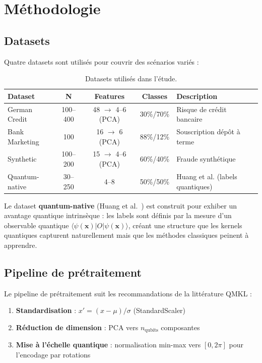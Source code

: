 \documentclass[12pt,a4paper]{article}
\newcommand{\x}{\mathbf{x}}
\begin{document}
\section{Méthodologie}
\label{sec:methodologie}

\subsection{Datasets}

Quatre datasets sont utilisés pour couvrir des scénarios variés :

\begin{table}[H]
\centering
\caption{Datasets utilisés dans l'étude.}
\label{tab:datasets}
\begin{tabular}{lcccp{5cm}}
\toprule
\textbf{Dataset} & \textbf{N} & \textbf{Features} & \textbf{Classes} & \textbf{Description} \\
\midrule
German Credit    & 100--400 & 48 $\to$ 4--6 (PCA) & 30\%/70\% & Risque de crédit bancaire \\
Bank Marketing   & 100      & 16 $\to$ 6 (PCA)    & 88\%/12\% & Souscription dépôt à terme \\
Synthetic        & 100--200 & 15 $\to$ 4--6 (PCA) & 60\%/40\% & Fraude synthétique \\
Quantum-native   & 30--250  & 4--8                 & 50\%/50\% & Huang et al. (labels quantiques) \\
\bottomrule
\end{tabular}
\end{table}

Le dataset \textbf{quantum-native} (Huang et al.~\cite{huang2021}) est construit pour exhiber un avantage quantique intrinsèque : les labels sont définis par la mesure d'un observable quantique $\langle \psi(\x) | O | \psi(\x) \rangle$, créant une structure que les kernels quantiques capturent naturellement mais que les méthodes classiques peinent à apprendre.

\subsection{Pipeline de prétraitement}

Le pipeline de prétraitement suit les recommandations de la littérature QMKL :
\begin{enumerate}[noitemsep]
    \item \textbf{Standardisation} : $x' = (x - \mu) / \sigma$ (StandardScaler)
    \item \textbf{Réduction de dimension} : PCA vers $n_{\text{qubits}}$ composantes
    \item \textbf{Mise à l'échelle quantique} : normalisation min-max vers $[0, 2\pi]$ pour l'encodage par rotations
\end{enumerate}
\end{document}

